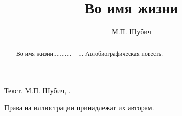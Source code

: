 ﻿%
\title{\huge\bf Во имя жизни}										%
\author{\LARGE М.П. Шубич}											%

\maketitle																			%


\abstractstyle{\footnotesize}
{\item Текст. М.П. Шубич, \theyear.\\ 
\item Права на иллюстрации принадлежат их авторам.}

\begin {abstract}
	 {Во имя жизни........... \--- ...}
	Автобиографическая повесть.
\end{abstract}


\setcounter{page}{3}										%